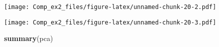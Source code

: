 \documentclass[]{article}
\newenvironment{Shaded}{\begin{snugshade}}{\end{snugshade}}
\newcommand{\KeywordTok}[1]{\textcolor[rgb]{0.13,0.29,0.53}{\textbf{#1}}}
\newcommand{\DataTypeTok}[1]{\textcolor[rgb]{0.13,0.29,0.53}{#1}}
\newcommand{\DecValTok}[1]{\textcolor[rgb]{0.00,0.00,0.81}{#1}}
\newcommand{\StringTok}[1]{\textcolor[rgb]{0.31,0.60,0.02}{#1}}
\newcommand{\OperatorTok}[1]{\textcolor[rgb]{0.81,0.36,0.00}{\textbf{#1}}}
\newcommand{\NormalTok}[1]{#1}
\begin{document}
\texttt{[image: Comp\_ex2\_files/figure-latex/unnamed-chunk-20-2.pdf]}

\begin{Shaded}
\end{Shaded}

\texttt{[image: Comp\_ex2\_files/figure-latex/unnamed-chunk-20-3.pdf]}

\begin{Shaded}
\begin{Highlighting}[]
\KeywordTok{summary}\NormalTok{(pca)}
\end{Highlighting}
\end{Shaded}
\end{document}
